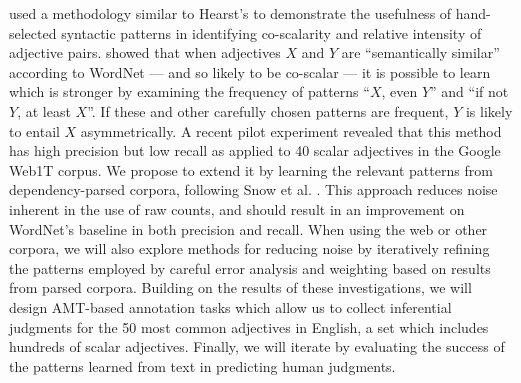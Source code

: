 \documentclass[10pt]{article}
\begin{document}
\vspace {-3mm}

\cite{sheinmanetal2013,sheinman2009adjscales} used a methodology similar to Hearst's \cite{hearst1992automatic} to demonstrate the usefulness of  hand-selected syntactic patterns in identifying co-scalarity and relative intensity of adjective pairs. 
\cite{sheinmanetal2013} showed that when adjectives $X$ and $Y$ are ``semantically similar'' according to WordNet --- and so likely to be co-scalar --- it is possible to learn which is stronger by examining the frequency of patterns ``$X$, even $Y$'' and ``if not $Y$, at least $X$''. If these and other carefully chosen patterns are frequent, $Y$ is likely to entail $X$ asymmetrically. A recent pilot experiment revealed that this method has high precision but low recall as applied to 40 scalar adjectives in the Google Web1T corpus. We propose to extend it by learning the relevant patterns from dependency-parsed corpora, following Snow et al. \cite{snow04,snow2006semantic}. This approach reduces noise inherent in the use of raw counts, and should result in an improvement on WordNet's baseline in both precision and recall. When using the web or other corpora, we will also explore methods for reducing noise by iteratively refining the patterns employed by careful error analysis and weighting based on results from parsed corpora.
Building on the results of these investigations, we will design AMT-based annotation tasks which allow us to collect inferential judgments for the 50 most common adjectives in English, a set which includes hundreds of scalar adjectives. Finally, we will iterate by evaluating the success of the patterns learned from text in predicting human judgments.
\end{document}
